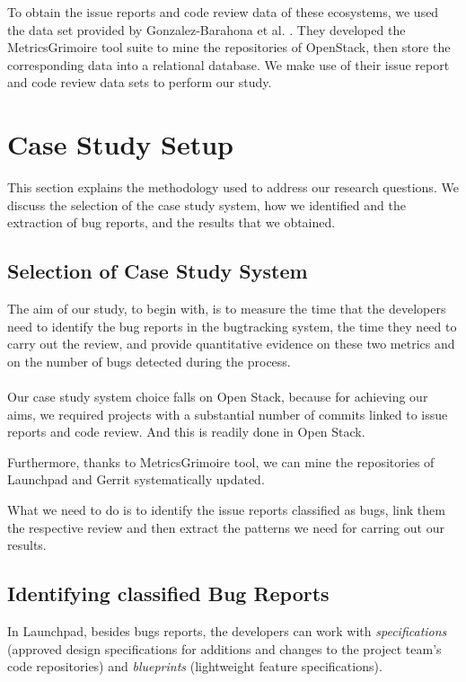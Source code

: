 \documentclass[ifip]{svmult}
\begin{document}
To obtain the issue reports and code review data of these ecosystems, we used the data set 
provided by Gonzalez-Barahona et al. \cite{contribution21}.  They  developed the  MetricsGrimoire tool suite to mine the repositories of
OpenStack, then store the corresponding data into a relational database. We make use of their issue
report and code review data sets \cite{contribution22} to perform our study.


\section{Case Study Setup}
\label{sec:4}

This section explains the methodology used to address our research questions.  
We discuss the selection of the case study system, how we identified and the extraction of 
bug reports, and the results that we obtained.


\subsection{Selection of Case Study System}
The aim of our study, to begin with, is to measure the time that the developers need to identify 
the bug reports in the bugtracking system, 
the time they need to carry out the review, and provide quantitative evidence on these two metrics and
on the number of bugs detected during the process. 
\\
\\
Our case study system choice falls on Open Stack, because for achieving our aims, we required projects with a
substantial number of commits linked to issue reports and code review. And this is 
readily done in Open Stack.

Furthermore, thanks to MetricsGrimoire tool, we can mine the repositories of Launchpad and Gerrit systematically updated.

What we need to do is to identify the issue reports classified as bugs, link them the respective review and then 
extract the patterns we need for carring out our results.

\subsection{Identifying classified Bug Reports}
\label{sec:4.1}

In Launchpad, besides bugs reports, the developers can work with \textit{specifications} 
(approved design specifications for additions and changes to the project team’s code repositories) 
and \textit{blueprints} (lightweight feature specifications).
\end{document}
